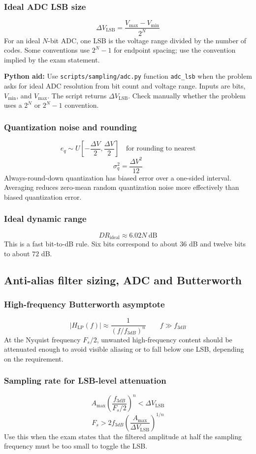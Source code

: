 \subsubsection{Ideal ADC LSB size}
\[
\Delta V_{\mathrm{LSB}}=\frac{V_{\max}-V_{\min}}{2^N}
\]
For an ideal \(N\)-bit ADC, one LSB is the voltage range divided by the number of codes. Some conventions use \(2^N-1\) for endpoint spacing; use the convention implied by the exam statement.

\textbf{Python aid:} Use \texttt{scripts/sampling/adc.py} function \texttt{adc\_lsb} when the problem asks for ideal ADC resolution from bit count and voltage range. Inputs are bits, \(V_{\min}\), and \(V_{\max}\). The script returns \(\Delta V_{\mathrm{LSB}}\). Check manually whether the problem uses a \(2^N\) or \(2^N-1\) convention.

\subsubsection{Quantization noise and rounding}
\[
e_q\sim U\left[-\frac{\Delta V}{2},\frac{\Delta V}{2}\right]\quad\text{for rounding to nearest}
\]
\[
\sigma_q^2=\frac{\Delta V^2}{12}
\]
Always-round-down quantization has biased error over a one-sided interval. Averaging reduces zero-mean random quantization noise more effectively than biased quantization error.

\subsubsection{Ideal dynamic range}
\[
DR_{\mathrm{ideal}}\approx 6.02N\ \mathrm{dB}
\]
This is a fast bit-to-dB rule. Six bits correspond to about \(36\) dB and twelve bits to about \(72\) dB.

\subsection{Anti-alias filter sizing, ADC and Butterworth}

\subsubsection{High-frequency Butterworth asymptote}
\[
|H_{\mathrm{LP}}(f)|\approx \frac{1}{(f/f_{3dB})^n}\qquad f\gg f_{3dB}
\]
At the Nyquist frequency \(F_s/2\), unwanted high-frequency content should be attenuated enough to avoid visible aliasing or to fall below one LSB, depending on the requirement.

\subsubsection{Sampling rate for LSB-level attenuation}
\[
A_{\max}\left(\frac{f_{3dB}}{F_s/2}\right)^n<\Delta V_{\mathrm{LSB}}
\]
\[
F_s>2f_{3dB}\left(\frac{A_{\max}}{\Delta V_{\mathrm{LSB}}}\right)^{1/n}
\]
Use this when the exam states that the filtered amplitude at half the sampling frequency must be too small to toggle the LSB.

